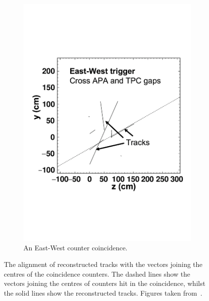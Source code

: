 \begin{figure}[h!]
\begin{subfigure}{0.45\textwidth}
    \includegraphics[width=\textwidth]{East-West}
    \caption{An East-West counter coincidence.}
  \end{subfigure}
  \caption[The alignment of reconstructed tracks with the vectors joining the centres of the coincidence counters]
          {The alignment of reconstructed tracks with the vectors joining the centres of the coincidence counters. The dashed lines show the vectors joining the centres of counters hit in the coincidence, whilst the solid lines show the reconstructed tracks. Figures taken from~\citep{TingjunClustering}.}
          \label{fig:CounterTrackAngle}
\end{figure}

